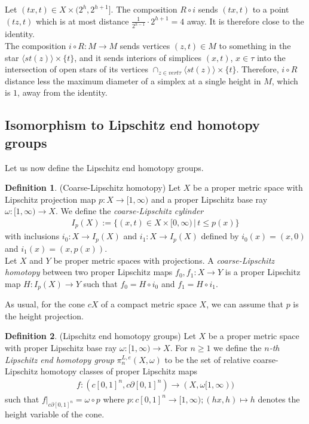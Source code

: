 \documentclass[a4paper,11pt]{article}
\theoremstyle{definition}
\newtheorem{definition}{Definition}[section]
\theoremstyle{plain}
\theoremstyle{remark}
\begin{document}
{Let $(tx,t) \in X \times (2^h,2^{h+1}]$. The composition $R \circ i$ sends $(tx,t)$ to a point $(tz,t)$ which is at most distance $\frac{1}{2^{h-1}} \cdot 2^{h+1} = 4$ away.  It is therefore close to the identity.\\

The composition $i\circ R: M\rightarrow M$ sends vertices $(z,t)\in M$ to something in the star $\langle st(z)\rangle \times \{t\}$, and it sends interiors of simplices $(x,t)$, $x\in \tau$ into the intersection of open stars of its vertices $\cap_{z \in vert \tau} \langle st(z) \rangle \times \{t\}$. Therefore, $i\circ R$ distance less the maximum diameter of a simplex at a single height in $M$, which is $1$, away from the identity.  \\

\subsection{Isomorphism to Lipschitz end homotopy groups}

Let us now define the Lipschitz end homotopy groups. 


\begin{definition} (Coarse-Lipschitz homotopy) Let $X$ be a proper metric space with Lipschitz projection map $p: X\rightarrow [1,\infty)$ and a proper Lipschitz base ray $\omega: [1,\infty)\rightarrow X$. We define the \textit{coarse-Lipschitz cylinder}
\begin{align*}
I_{p}(X) := \{(x,t)\in X\times [0,\infty) \,|\, t\leq p(x)\}
\end{align*}
with inclusions $i_0: X\rightarrow I_{p}(X)$ and $i_{1}: X\rightarrow I_{p}(X)$ defined by $i_0(x) = (x,0)$ and $i_1(x) = (x,p(x))$.\\

Let $X$ and $Y$ be proper metric spaces with projections. A \textit{coarse-Lipschitz homotopy} between two proper Lipschitz maps $f_0, f_1: X\rightarrow Y$ is a proper Lipschitz map $H: I_{p}(X)\rightarrow Y$ such that $f_0 = H\circ i_0$ and $f_1 = H\circ i_1$.
\end{definition}

As usual, for the cone $cX$ of a compact metric space $X$, we can assume that $p$ is the height projection. 

\begin{definition} (Lipschitz end homotopy groups) Let $X$ be a proper metric space with proper Lipschitz base ray $\omega: [1,\infty)\rightarrow X$. For $n\geq 1$ we define the \textit{$n$-th Lipschitz end homotopy group} $\pi_n^{L,e}(X,\omega)$ to be the set of relative coarse-Lipschitz homotopy classes of proper Lipschitz maps 
\begin{align*}
f: (c[0,1]^n,c\partial [0,1]^n)\rightarrow (X,\omega[1,\infty))
\end{align*}
such that $f|_{c\partial[0,1]^n} = \omega\circ p$ where $p: c[0,1]^n \rightarrow [1,\infty); (hx,h)\mapsto h$ denotes the height variable of the cone. \\


\end{definition}}
\end{document}

